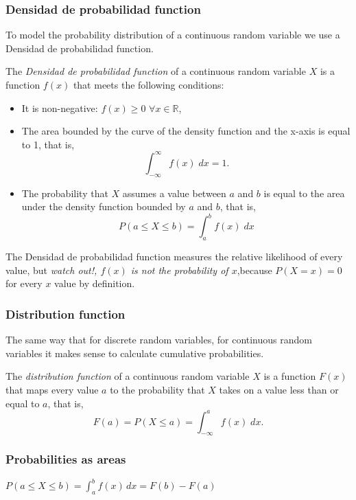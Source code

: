 \begin{frame}
\frametitle{Densidad de probabilidad function}
To model the probability distribution of a continuous random variable we use a Densidad de probabilidad function.

\begin{definition}
The \emph{Densidad de probabilidad function} of a continuous random variable $X$ is a function $f(x)$ that meets the following conditions:
\begin {itemize}
\item It is non-negative: $f(x)\geq 0$ $\forall x\in \mathbb{R}$,
\item The area bounded by the curve of the density function and the x-axis is equal to 1, that is,
\[
\int_{-\infty}^{\infty} f(x)\; dx = 1.
\]
\item The probability that $X$ assumes a value between $a$ and $b$ is equal to the area under the density function
bounded by $a$ and $b$, that is,
\[
P(a\leq X\leq b) = \int_a^b f(x)\; dx
\]
\end{itemize}
\end{definition}

The Densidad de probabilidad function measures the relative likelihood of every value, but \alert{\emph{watch out!, $f(x)$ is not the probability of $x$}},because $P(X=x)=0$ for every $x$ value by definition.
\end{frame}


\begin{frame}
\frametitle{Distribution function}
The same way that for discrete random variables, for continuous random variables it makes sense to calculate cumulative
probabilities.

\begin{definition}
The \emph{distribution function} of a continuous random variable $X$ is a function $F(x)$ that maps every value $a$ to the probability that $X$ takes on a value less than or equal to $a$, that is,
\[
F(a) = P(X\leq a) = \int_{-\infty}^{a} f(x)\; dx.
\]
\end{definition}

\end{frame}


\begin{frame}
\frametitle{Probabilities as areas}

\begin{center}
$\displaystyle P(a\leq X\leq b) = \int_a^b f(x)\, dx = F(b)-F(a)$
\end{center}
\end{frame}



